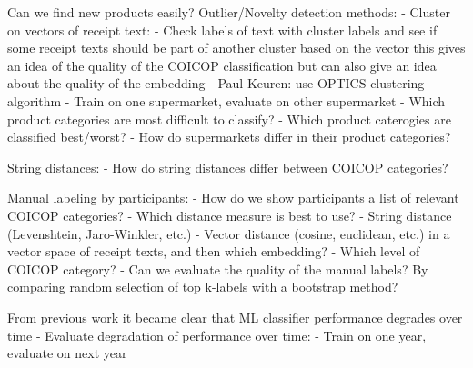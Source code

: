 \documentclass{article}
\begin{document}
Can we find new products easily? Outlier/Novelty detection methods:    
    - Cluster on vectors of receipt text:
        - Check labels of text with cluster labels and see if some receipt texts should be part of another cluster based on the vector
        this gives an idea of the quality of the COICOP classification but can also give an idea about the quality of the embedding
        - Paul Keuren: use OPTICS clustering algorithm
- Train on one supermarket, evaluate on other supermarket
- Which product categories are most difficult to classify?
- Which product caterogies are classified best/worst?
- How do supermarkets differ in their product categories?

String distances:
- How do string distances differ between COICOP categories?

Manual labeling by participants:
- How do we show participants a list of relevant COICOP categories?
    - Which distance measure is best to use?
        - String distance (Levenshtein, Jaro-Winkler, etc.)
        - Vector distance (cosine, euclidean, etc.) in a vector space of receipt texts, and then which embedding?
- Which level of COICOP category?
- Can we evaluate the quality of the manual labels? By comparing random selection of top k-labels with a 
bootstrap method?

From previous work it became clear that ML classifier performance degrades over time
- Evaluate degradation of performance over time:
    - Train on one year, evaluate on next year
\end{document}
